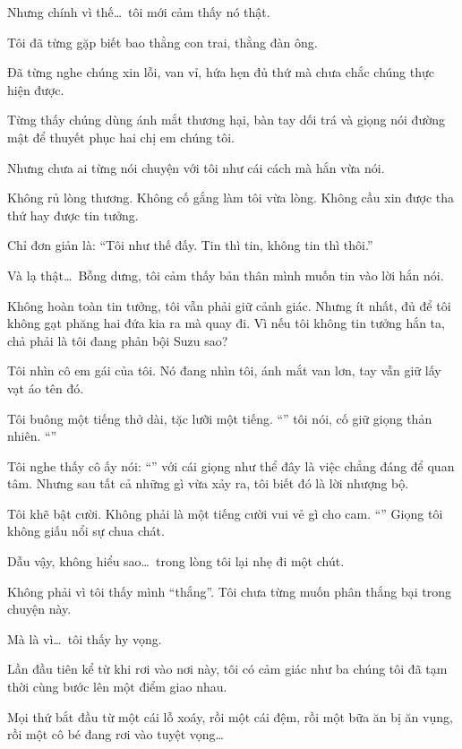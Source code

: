 \documentclass[../main.tex]{subfiles}
\begin{document}
Nhưng chính vì thế\dots\ tôi mới cảm thấy nó thật.

Tôi đã từng gặp biết bao thằng con trai, thằng đàn ông.

Đã từng nghe chúng xin lỗi, van vỉ, hứa hẹn đủ thứ mà chưa chắc chúng thực hiện được.

Từng thấy chúng dùng ánh mắt thương hại, bàn tay dối trá và giọng nói đường mật để thuyết phục hai chị em chúng tôi.

Nhưng chưa ai từng nói chuyện với tôi như cái cách mà hắn vừa nói.

Không rủ lòng thương. Không cố gắng làm tôi vừa lòng. Không cầu xin được tha thứ hay được tin tưởng.

Chỉ đơn giản là: ``Tôi như thế đấy. Tin thì tin, không tin thì thôi.''

Và lạ thật\dots\ Bỗng dưng, tôi cảm thấy bản thân mình muốn tin vào lời hắn nói.

Không hoàn toàn tin tưởng, tôi vẫn phải giữ cảnh giác. Nhưng ít nhất, đủ để tôi không gạt phăng hai đứa kia ra mà quay đi. Vì nếu tôi không tin tưởng hắn ta, chả phải là tôi đang phản bội Suzu sao?

Tôi nhìn cô em gái của tôi.  Nó đang nhìn tôi, ánh mắt van lơn, tay vẫn giữ lấy vạt áo tên đó.

Tôi buông một tiếng thở dài, tặc lưỡi một tiếng. ``'' tôi nói, cố giữ giọng thản nhiên. ``''


Tôi nghe thấy cô ấy nói: ``'' với cái giọng như thể đây là việc chẳng đáng để quan tâm. Nhưng sau tất cả những gì vừa xảy ra, tôi biết đó là lời nhượng bộ.

Tôi khẽ bật cười. Không phải là một tiếng cười vui vẻ gì cho cam. ``'' Giọng tôi không giấu nổi sự chua chát.

Dẫu vậy, không hiểu sao\dots\ trong lòng tôi lại nhẹ đi một chút.

Không phải vì tôi thấy mình ``thắng''. Tôi chưa từng muốn phân thắng bại trong chuyện này.

Mà là vì\dots\ tôi thấy hy vọng.

Lần đầu tiên kể từ khi rơi vào nơi này, tôi có cảm giác như ba chúng tôi đã tạm thời cùng bước lên một điểm giao nhau.

Mọi thứ bắt đầu từ một cái lỗ xoáy, rồi một cái đệm, rồi một bữa ăn bị ăn vụng, rồi một cô bé đang rơi vào tuyệt vọng\dots
\end{document}
